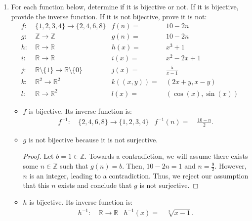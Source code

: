 \documentclass{article}
\begin{document}
\begin{enumerate}
	\item For each function below, determine if it is bijective or not.  If it is bijective, provide the inverse function.  If it is not bijective, prove it is not:
		  \begin{align*}
			f : & \ \{ 1, 2, 3, 4 \} \rightarrow \{ 2, 4, 6, 8 \} & f(n) = & \ 10 - 2n \\
			g : & \ \mathbb{Z} \rightarrow \mathbb{Z} & g(n) = & \ 10 - 2n \\
			h : & \ \mathbb{R} \rightarrow \mathbb{R} & h(x) = & \ x^3 + 1 \\
			i : & \ \mathbb{R} \rightarrow \mathbb{R} & i(x) = & \ x^2 - 2x + 1 \\
			j : & \ \mathbb{R} \setminus \{ 1 \} \rightarrow \mathbb{R} \setminus \{ 0 \} & j(x) = & \ \frac{5}{x-1} \\
			k : & \ \mathbb{R}^2 \rightarrow \mathbb{R}^2 & k((x,y)) = & \ (2x+y, x-y) \\
			l : & \ \mathbb{R} \rightarrow \mathbb{R}^2 & l(x) = & \ (\cos(x), \sin(x))
		  \end{align*}

            \begin{itemize}
                \item $f$ is bijective. Its inverse function is: 
                    \begin{align*}
                        f^{\minus1} : & \ \{ 2, 4, 6, 8 \} \rightarrow \{ 1, 2, 3, 4 \} & f^{\minus1}(n) = & \ \frac{10 - n}{2}.
                    \end{align*}

                \item $g$ is not bijective because it is not surjective.
                    \begin{proof}
                        Let $b = 1\in\mathbb{Z}$. Towards a contradiction, we will assume there exists some $n\in\mathbb{Z}$ such that $g(n) = b$. Then, $10 - 2n = 1$ and $n = \frac{9}{2}$. However, $n$ is an integer, leading to a contradiction. Thus, we reject our assumption that this $n$ exists and conclude that $g$ is not surjective. 
                    \end{proof}

                \item $h$ is bijective. Its inverse function is:
                    \begin{align*}
                        h^{\minus1} : & \ \mathbb{R} \rightarrow \mathbb{R} & h^{\minus1}(x) = & \ \sqrt[3]{x - 1}.
                    \end{align*}
                    

\end{itemize}
\end{enumerate}
\end{document}
